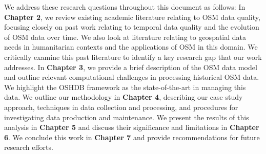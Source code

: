 We address these research questions throughout this document as follows: In \textbf{Chapter 2}, we review existing academic literature relating to OSM data quality, focusing closely on past work relating to temporal data quality and the evolution of OSM data over time. We also look at literature relating to geospatial data needs in humanitarian contexts and the applications of OSM in this domain. We critically examine this past literature to identify a key research gap that our work addresses. In \textbf{Chapter 3}, we provide a brief description of the OSM data model and outline relevant computational challenges in processing historical OSM data. We highlight the OSHDB framework \parencite{raifer_oshdb_2019} as the state-of-the-art in managing this data. We outline our methodology in \textbf{Chapter 4}, describing our case study approach, techniques in data collection and processing, and procedures for investigating data production and maintenance. We present the results of this analysis in \textbf{Chapter 5} and discuss their significance and limitations in \textbf{Chapter 6}. We conclude this work in \textbf{Chapter 7} and provide recommendations for future research efforts. 

